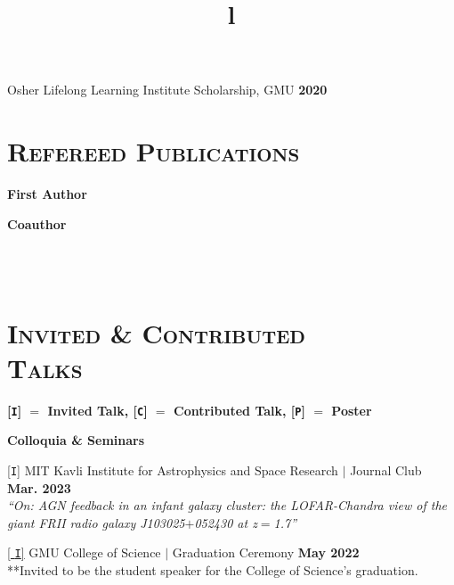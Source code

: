 \documentclass[marg, centered]{res}
\begin{document}
\begin{resume}
{Osher Lifelong Learning Institute Scholarship, GMU \hfill \textbf{2020}}
\vspace{-0.0cm}


\section{{\scshape \bfseries Refereed Publications}}

\vspace{-0.1cm}
\textbf{First Author}
\vspace{0.05cm}

\textbf{Coauthor}
\vspace{0.05cm}
\vspace{0.05cm}


\begin{format}
\title{l} \\
 \\
\body
\end{format}

\section{{\scshape \bfseries Invited \& Contributed \\Talks}}

\textbf{{[\texttt{I}]} $=$ Invited Talk, {[\texttt{C}]} $=$ Contributed Talk, {[\texttt{P}]} $=$ Poster}

\textbf{Colloquia \& Seminars}

\begin{talks}[itemindent=0pt, leftmargin=19pt]
    
\item[{[\texttt{I}]}] MIT Kavli Institute for Astrophysics and Space Research $|$ Journal Club \hfill \textbf{Mar. 2023} \\
\textit{``On: AGN feedback in an infant galaxy cluster: the LOFAR-Chandra view of the giant FRII radio galaxy J103025$+$052430 at z$=$1.7''}

\item[{[\href{https://www.youtube.com/watch?v=xsyi9sqYH4o}{\color{dkbu} \texttt{I}]}}] GMU College of Science $|$ Graduation Ceremony \hfill \textbf{May 2022} \\
**Invited to be the student speaker for the College of Science's graduation.


\end{talks}
\end{resume}
\end{document}
